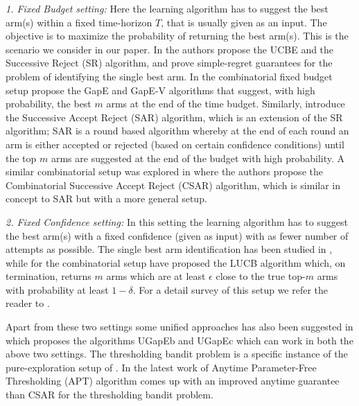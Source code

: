	\emph{1. Fixed Budget setting:} Here the learning algorithm has to suggest the best arm(s) within a fixed time-horizon $T$, that is usually given as an input. The objective is to maximize the probability of returning the best arm(s).  This is the scenario we consider in our paper. In \cite{audibert2010best} the authors propose the  UCBE and the Successive Reject (SR) algorithm, and prove simple-regret guarantees for the problem of identifying the single best arm.  In the combinatorial fixed budget setup \cite{gabillon2011multi} propose the GapE and GapE-V algorithms that suggest, with high probability, the best $m$ 
	 arms at the end of the time budget. Similarly, \cite{bubeck2013multiple} introduce the  Successive Accept Reject (SAR) algorithm, which is an extension of the SR algorithm; SAR is a round based algorithm whereby at the end of each round an arm is either accepted or rejected (based on certain confidence conditions) until the top $m$ arms are suggested at the end of the budget with high probability. A similar combinatorial setup was explored in \cite{chen2014combinatorial} where the authors propose the Combinatorial Successive Accept Reject (CSAR) algorithm, which is similar in concept to SAR but with a more general setup. 

	\emph{2. Fixed Confidence setting:} In this setting the learning algorithm has to suggest the best arm(s) with a fixed confidence (given as input) with as fewer number of attempts as possible. The single best arm identification has been studied in \cite{even2006action}, while for the combinatorial setup \cite{kalyanakrishnan2012pac} have proposed the LUCB algorithm which, on termination, returns  $m$ arms which are at least $\epsilon$ close to the true top-$m$ arms with probability at least $1-\delta$. For a detail survey of this setup we refer the reader to \cite{jamieson2014best}. 

Apart from these two settings some unified approaches has also been suggested in \cite{gabillon2012best} which proposes the algorithms UGapEb and UGapEc which can work in both the above two settings. The thresholding bandit problem is a specific instance of the pure-exploration setup of \cite{chen2014combinatorial}. In the latest work of \cite{locatelli2016optimal} Anytime Parameter-Free Thresholding (APT) algorithm comes up with an improved anytime guarantee than CSAR for the thresholding bandit problem.	
	
